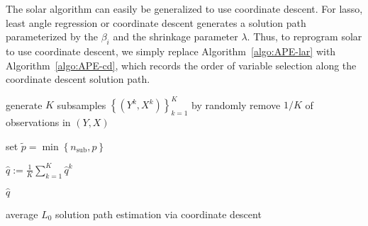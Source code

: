 \documentclass[11pt,review,authoryear]{elsarticle}
\begin{document}
The solar algorithm can easily be generalized to use coordinate descent. For lasso, least angle regression or coordinate descent generates a solution path parameterized by the $\beta_i$ and the shrinkage parameter $\lambda$. Thus, to reprogram solar to use coordinate descent, we simply replace Algorithm~\ref{algo:APE-lar} with Algorithm~\ref{algo:APE-cd}, which records the order of variable selection along the coordinate descent solution path.

\smallskip
\begin{algorithm}[ht]


  \smallskip

  generate $K$ subsamples $\left\{ \left( Y^k, X^k \right) \right\}^{K}_{k=1}$ by randomly remove $1/K$ of observations in $\left( Y, X \right)$\;

  set $\widetilde{p} = \min\left\{ n_{\mathrm{sub}}, p \right\}$ \;


  $\widehat{q} := \frac{1}{K} \sum_{k=1}^{K} \widehat{q}^k$\; 

  \Return $\widehat{q}$

\caption{average $L_0$ solution path estimation via coordinate descent \label{algo:APE-cd}}

\end{algorithm}
\end{document}
